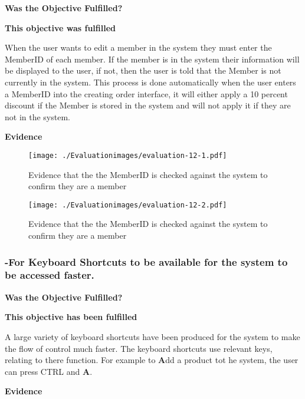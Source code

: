 \textbf{Was the Objective Fulfilled?} \newline

\textbf{\large{This objective was fulfilled}}

When the user wants to edit a member in the system they must enter the MemberID of each member. If the member is in the system their information will be displayed to the user, if not, then the user is told that the Member is not currently in the system. This process is done automatically when the user enters a MemberID into the creating order interface, it will either apply a 10 percent discount if the Member is stored in the system and will not apply it if they are not in the system.

\pagebreak

\textbf{Evidence} \newline

\begin{figure}[H]
\caption{Evidence that the the MemberID is checked against the system to confirm they are a member} \label{fig:evaluation-12-1}
\hfill\texttt{[image: ./Evaluationimages/evaluation-12-1.pdf]}
\end{figure}

\begin{figure}[H]
\caption{Evidence that the the MemberID is checked against the system to confirm they are a member} \label{fig:evaluation-12-2}
\hfill\texttt{[image: ./Evaluationimages/evaluation-12-2.pdf]}
\end{figure}






\pagebreak
\subsubsection{-For Keyboard Shortcuts to be available for the system to be accessed faster.}
\textbf{Was the Objective Fulfilled?} \newline

\textbf{\large{This objective has been fulfilled}}

A large variety of keyboard shortcuts have been produced for the system to make the flow of control much faster. The keyboard shortcuts use relevant keys, relating to there function. For example to \textbf{A}dd a product tot he system, the user can press CTRL and \textbf{A}. 

\textbf{Evidence} \newline

